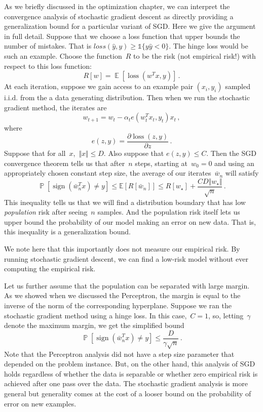 \documentclass{tufte-book}
\begin{document}
As we briefly discussed in the optimization chapter, we can interpret
the convergence analysis of stochastic gradient descent as directly
providing a generalization bound for a particular variant of SGD. Here
we give the argument in full detail. Suppose that we choose a loss
function that upper bounds the number of mistakes. That is
\(\mathit{loss}(\hat{y},y) \geq \mathbb{1}\{y\hat{y}<0\}\). The hinge
loss would be such an example. Choose the function~\(R\) to be the risk
(not empirical risk!) with respect to this loss function: \[
    R[w] = \mathop\mathbb{E}[ \operatorname{loss}(w^T x, y) ]\,.
\] At each iteration, suppose we gain access to an example pair
\((x_i, y_i)\) sampled i.i.d. from the a data generating distribution.
Then when we run the stochastic gradient method, the iterates are \[
    w_{t+1} = w_t - \alpha_t e(w_t^Tx_t,y_t) x_t\,,
\] where \[
    e(z,y) = \frac{\partial \operatorname{loss}(z,y)}{\partial z}\,.
\] Suppose that for all~\(x\),~\(\Vert x \Vert \leq D\). Also suppose
that \(e(z,y)\leq C\). Then the SGD convergence theorem tells us that
after~\(n\) steps, starting at~\(w_0=0\) and using an appropriately
chosen constant step size, the average of our iterates~\(\bar{w}_n\)
will satisfy \[
\mathop\mathbb{P}[\operatorname{sign}(\bar{w}_n^T x ) \neq y ] \leq
\mathbb{E}[R[\bar{w}_n]] \leq R[w_\star]  + \frac{C D \Vert w_\star \Vert }{\sqrt{n}}\,.
\] This inequality tells us that we will find a distribution boundary
that has low \emph{population} risk after seeing~\(n\) samples. And the
population risk itself lets us upper bound the probability of our model
making an error on new data. That is, this inequality is a
generalization bound.

We note here that this importantly does not measure our empirical risk.
By running stochastic gradient descent, we can find a low-risk model
without ever computing the empirical risk.

Let us further assume that the population can be separated with large
margin. As we showed when we discussed the Perceptron, the margin is
equal to the inverse of the norm of the corresponding hyperplane.
Suppose we ran the stochastic gradient method using a hinge loss. In
this case,~\(C=1\), so, letting~\(\gamma\) denote the maximum margin, we
get the simplified bound \[
\mathop\mathbb{P}[\operatorname{sign}(\bar{w}_n^T x ) \neq y ] \leq
 \frac{D}{\gamma\sqrt{n}}\,.
\] Note that the Perceptron analysis did not have a step size parameter
that depended on the problem instance. But, on the other hand, this
analysis of SGD holds regardless of whether the data is separable or
whether zero empirical risk is achieved after one pass over the data.
The stochastic gradient analysis is more general but generality comes at
the cost of a looser bound on the probability of error on new examples.
\end{document}
